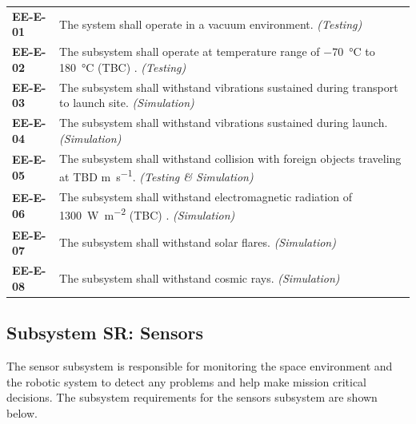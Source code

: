 \documentclass[12pt, letterpaper]{article}
\begin{document}
\begin{longtable}{P{2cm}P{13.75cm}}
\textbf{EE-E-01}	& The system shall operate in a vacuum environment. \textit{(Testing)}													\\
\textbf{EE-E-02}	& The subsystem shall operate at temperature range of \SI{-70}{\degreeCelsius} to \SI{180}{\degreeCelsius} (TBC) \cite{NASAsysreq_Kumar}. \textit{(Testing)}										\\
\textbf{EE-E-03}	& The subsystem shall withstand vibrations sustained during transport to launch site. \textit{(Simulation)}		\\
\textbf{EE-E-04}	& The subsystem shall withstand vibrations sustained during launch. \textit{(Simulation)}						\\
\textbf{EE-E-05}	& The subsystem shall withstand collision with foreign objects traveling at TBD \si{\m\per\s}. \textit{(Testing \& Simulation)}														\\
\textbf{EE-E-06}	& The subsystem shall withstand electromagnetic radiation of \SI{1300}{\watt\per\square\m} (TBC) \cite{FAA_radiation}. \textit{(Simulation)}												\\
\textbf{EE-E-07}	& The subsystem shall withstand solar flares. \textit{(Simulation)}												\\
\textbf{EE-E-08}	& The subsystem shall withstand cosmic rays. \textit{(Simulation)}												\\
\end{longtable}

\subsection{Subsystem SR: Sensors}
The sensor subsystem is responsible for monitoring the space environment and the robotic system to detect any problems and help make mission critical decisions. The subsystem requirements for the sensors subsystem are shown below.
\end{document}
